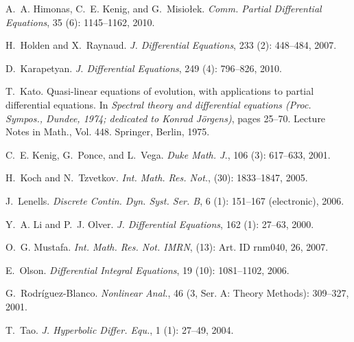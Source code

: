 \documentclass[final,noinfo]{nddiss2e}
\begin{document}
\begin{thebibliography}{35}
A.~A. Himonas, C.~E. Kenig, and G.~Misio{\l}ek.
\newblock \emph{Comm. Partial Differential Equations}, 35
  (6): 1145--1162, 2010.

H.~Holden and X.~Raynaud.
\newblock \emph{J. Differential Equations}, 233 (2):
  448--484, 2007.

D.~Karapetyan.
\newblock \emph{J. Differential Equations}, 249 (4):
  796--826, 2010.

T.~Kato.
\newblock Quasi-linear equations of evolution, with applications to partial
  differential equations.
\newblock In \emph{Spectral theory and differential equations ({P}roc.
  {S}ympos., {D}undee, 1974; dedicated to {K}onrad {J}{\"o}rgens)}, pages
  25--70. Lecture Notes in Math., Vol. 448. Springer, Berlin, 1975.

C.~E. Kenig, G.~Ponce, and L.~Vega.
\newblock \emph{Duke Math. J.}, 106 (3): 617--633, 2001.

H.~Koch and N.~Tzvetkov.
\newblock \emph{Int. Math. Res. Not.},  (30): 1833--1847,
  2005.

J.~Lenells.
\newblock \emph{Discrete Contin. Dyn. Syst. Ser. B}, 6 (1):
  151--167 (electronic), 2006.

Y.~A. Li and P.~J. Olver.
\newblock \emph{J. Differential Equations}, 162 (1): 27--63,
  2000.

O.~G. Mustafa.
\newblock \emph{Int. Math. Res. Not. IMRN},  (13): Art. ID
  rnm040, 26, 2007.

E.~Olson.
\newblock \emph{Differential Integral Equations}, 19 (10):
  1081--1102, 2006.

G.~Rodr\'iguez-Blanco.
\newblock \emph{Nonlinear Anal.}, 46 (3, Ser. A: Theory
  Methods): 309--327, 2001.

T.~Tao.
\newblock \emph{J. Hyperbolic Differ. Equ.}, 1 (1): 27--49,
  2004.


\end{thebibliography}
\end{document}
